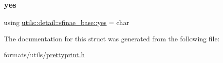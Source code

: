 \mbox{\label{structutils_1_1detail_1_1sfinae__base_ad5567f856d8b9af7d1af85c2555ce0e5}} 
\subsubsection{\texorpdfstring{yes}{yes}}
{\footnotesize\ttfamily using \mbox{\hyperlink{structutils_1_1detail_1_1sfinae__base_ad5567f856d8b9af7d1af85c2555ce0e5}{utils\+::detail\+::sfinae\+\_\+base\+::yes}} =  char}



The documentation for this struct was generated from the following file\+:\begin{DoxyCompactItemize}
\item 
formats/utils/\mbox{\hyperlink{prettyprint_8h}{prettyprint.\+h}}\end{DoxyCompactItemize}
